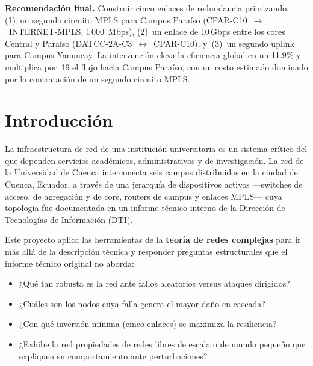 \documentclass[11pt, a4paper]{article}
\newenvironment{resumen}{%
    \begin{mdframed}[backgroundcolor=grisfondo, linecolor=borde,
        linewidth=4pt, leftline=true, rightline=false,
        topline=false, bottomline=false,
        innerleftmargin=10pt, innerrightmargin=10pt,
        innertopmargin=8pt, innerbottommargin=8pt,
        leftmargin=0pt, rightmargin=0pt,
        skipabove=10pt, skipbelow=10pt]
    \small
}{\end{mdframed}}
\begin{document}
\begin{resumen}
\medskip
\textbf{Recomendación final.} Construir cinco enlaces de redundancia
priorizando: (1)~un segundo circuito MPLS para Campus Paraíso
(CPAR-C10~$\to$~INTERNET-MPLS, 1\,000~Mbps), (2)~un enlace de 10\,Gbps entre
los cores Central y Paraíso (DATCC-2A-C3~$\leftrightarrow$~CPAR-C10),
y~(3)~un segundo uplink para Campus Yanuncay. La intervención eleva la
eficiencia global en un 11.9\% y multiplica por~19 el flujo hacia Campus
Paraíso, con un costo estimado dominado por la contratación de un segundo
circuito MPLS.
\end{resumen}

\newpage
{\setlength{\parskip}{0pt}\tableofcontents}
\vspace{1em}

\section{Introducción}

La infraestructura de red de una institución universitaria es un sistema crítico
del que dependen servicios académicos, administrativos y de investigación. La
red de la Universidad de Cuenca interconecta seis campus distribuidos en la
ciudad de Cuenca, Ecuador, a través de una jerarquía de dispositivos activos
---switches de acceso, de agregación y de core, routers de campus y enlaces
MPLS--- cuya topología fue documentada en un informe técnico interno de la
Dirección de Tecnologías de Información (DTI).

Este proyecto aplica las herramientas de la \textbf{teoría de redes complejas}
para ir más allá de la descripción técnica y responder preguntas estructurales
que el informe técnico original no aborda:

\begin{itemize}
    \item ¿Qué tan robusta es la red ante fallos aleatorios versus ataques
          dirigidos?
    \item ¿Cuáles son los nodos cuya falla genera el mayor daño en cascada?
    \item ¿Con qué inversión mínima (cinco enlaces) se maximiza la
          resiliencia?
    \item ¿Exhibe la red propiedades de redes libres de escala o de mundo
          pequeño que expliquen su comportamiento ante perturbaciones?
\end{itemize}
\end{document}
